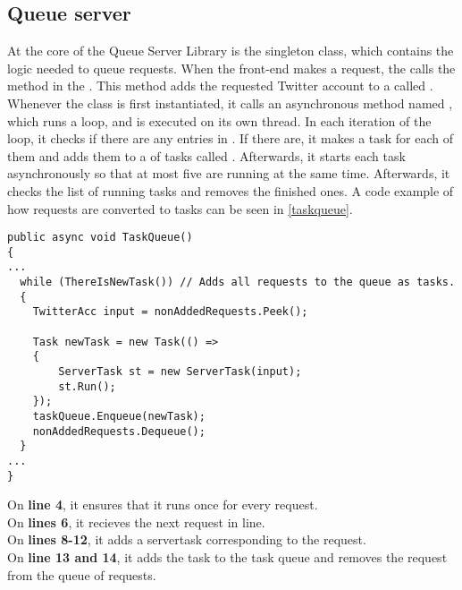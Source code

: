 \subsection{Queue server} \label{sub:queueserver}
At the core of the Queue Server Library is the 
singleton class, which contains the logic needed to queue requests. When the
front-end makes a request, the  calls the
 method in the . This method adds the
requested Twitter account to a  called .
Whenever the  class is first instantiated, it calls
an asynchronous method named , which runs a 
loop, and is executed on its own thread. In each iteration of the loop, it
checks if there are any entries in . If there are, it
makes a task for each of them and adds them to a  of tasks called
. Afterwards, it starts each task asynchronously so that at
most five are running at the same time.
Afterwards, it checks the list of running tasks and removes the finished ones. A
code example of how requests are converted to tasks can be seen in
\autoref{taskqueue}. \\

\begin{minipage}[H]{\linewidth}
\begin{lstlisting}[caption = Adding tasks to the queue., label = taskqueue] 
public async void TaskQueue()
{
...
  while (ThereIsNewTask()) // Adds all requests to the queue as tasks.
  {
	TwitterAcc input = nonAddedRequests.Peek();
	
	Task newTask = new Task(() =>
	{
	    ServerTask st = new ServerTask(input);
	    st.Run();
	});
	taskQueue.Enqueue(newTask);
	nonAddedRequests.Dequeue();
  }
...  
}

\end{lstlisting}
\end{minipage}

On \textbf{line 4}, it ensures that it runs once for every request. \\
On \textbf{lines 6}, it recieves the next request in line.\\
On \textbf{lines 8-12}, it adds a servertask corresponding to the request.\\
On \textbf{line 13 and 14}, it adds the task to the task queue and removes the
request from the queue of requests.\\

